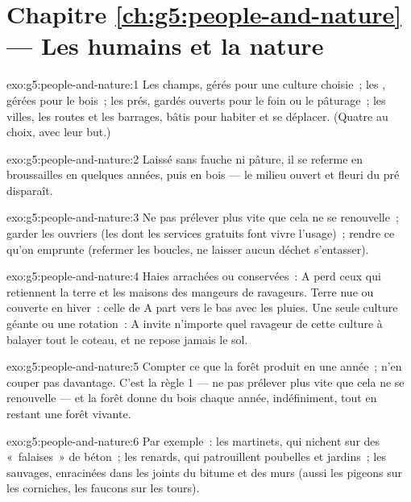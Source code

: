 \section*{Chapitre \ref{ch:g5:people-and-nature} --- Les humains et la nature}

\begin{solution}{exo:g5:people-and-nature:1}
Les champs, gérés pour une culture choisie~; les , gérées pour
le bois~; les prés, gardés ouverts pour le foin ou le pâturage~; les
villes, les routes et les barrages, bâtis pour habiter et se
déplacer. (Quatre au choix, avec leur but.)
\end{solution}

\begin{solution}{exo:g5:people-and-nature:2}
Laissé sans fauche ni pâture, il se referme en broussailles en
quelques années, puis en bois --- le milieu ouvert et fleuri du pré
disparaît.
\end{solution}

\begin{solution}{exo:g5:people-and-nature:3}
Ne pas prélever plus vite que cela ne se renouvelle~; garder les
ouvriers (les  dont les services gratuits font vivre
l'usage)~; rendre ce qu'on emprunte (refermer les boucles, ne
laisser aucun déchet s'entasser).
\end{solution}

\begin{solution}{exo:g5:people-and-nature:4}
Haies arrachées ou conservées~: A perd ceux qui retiennent la terre
et les maisons des mangeurs de ravageurs. Terre nue ou couverte en
hiver~: celle de A part vers le bas avec les pluies. Une seule
culture géante ou une rotation~: A invite n'importe quel ravageur de
cette culture à balayer tout le coteau, et ne repose jamais le sol.
\end{solution}

\begin{solution}{exo:g5:people-and-nature:5}
Compter ce que la forêt produit en une année~; n'en couper pas
davantage. C'est la règle 1 --- ne pas prélever plus vite que cela
ne se renouvelle --- et la forêt donne du bois chaque année,
indéfiniment, tout en restant une forêt vivante.
\end{solution}

\begin{solution}{exo:g5:people-and-nature:6}
Par exemple~: les martinets, qui nichent sur des «~falaises~» de
béton~; les renards, qui patrouillent poubelles et jardins~; les
 sauvages, enracinées dans les joints du bitume et des murs
(aussi les pigeons sur les corniches, les faucons sur les tours).
\end{solution}

